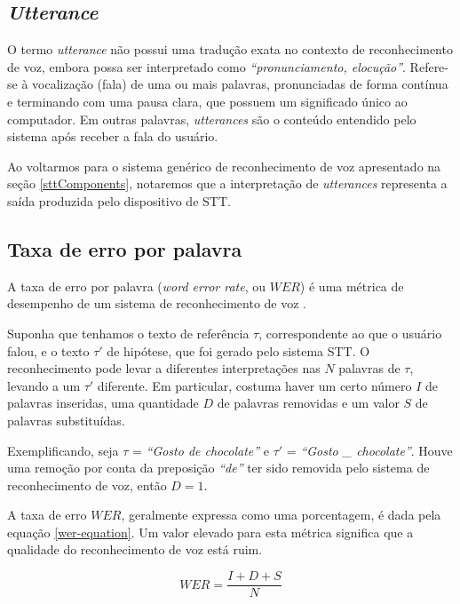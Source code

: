 \subsection{\textit{Utterance}}

O termo \textit{utterance} não possui uma tradução exata no contexto de reconhecimento de voz, embora possa ser interpretado como \textit{``pronunciamento, elocução''}. Refere-se à vocalização (fala) de uma ou mais palavras, pronunciadas de forma contínua e terminando com uma pausa clara, que possuem um significado único ao computador. Em outras palavras, \textit{utterances} são o conteúdo entendido pelo sistema após receber a fala do usuário.

Ao voltarmos para o sistema genérico de reconhecimento de voz apresentado na seção \ref{sttComponents}, notaremos que a interpretação de \textit{utterances} representa a saída produzida pelo dispositivo de STT.


\subsection{Taxa de erro por palavra}
\label{word-error-rate}

A taxa de erro por palavra (\textit{word error rate}, ou $WER$) é uma métrica de desempenho de um sistema de reconhecimento de voz \citep{wordErrorRate}.

Suponha que tenhamos o texto de referência $\tau$, correspondente ao que o usuário falou, e o texto $\tau'$ de hipótese, que foi gerado pelo sistema STT. O reconhecimento pode levar a diferentes interpretações nas $N$ palavras de $\tau$, levando a um $\tau'$ diferente. Em particular, costuma haver um certo número $I$ de palavras inseridas, uma quantidade $D$ de palavras removidas e um valor $S$ de palavras substituídas.

Exemplificando, seja $\tau$ = \textit{``Gosto de chocolate''} e $\tau'$ = \textit{``Gosto \_ chocolate''}. Houve uma remoção por conta da preposição \textit{``de''} ter sido removida pelo sistema de reconhecimento de voz, então $D = 1$.

A taxa de erro $WER$, geralmente expressa como uma porcentagem, é dada pela equação \ref{wer-equation}. Um valor elevado para esta métrica significa que a qualidade do reconhecimento de voz está ruim.

\begin{equation}
\label{wer-equation}
WER =  \frac{I + D + S}{N}
\end{equation}

